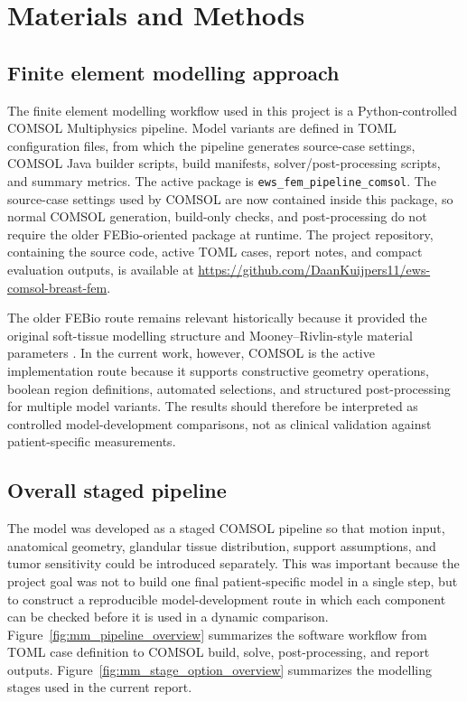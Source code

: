 \section{Materials and Methods}

\subsection{Finite element modelling approach}

The finite element modelling workflow used in this project is a Python-controlled COMSOL Multiphysics pipeline. Model variants are defined in TOML configuration files, from which the pipeline generates source-case settings, COMSOL Java builder scripts, build manifests, solver/post-processing scripts, and summary metrics. The active package is \texttt{ews\_fem\_pipeline\_comsol}. The source-case settings used by COMSOL are now contained inside this package, so normal COMSOL generation, build-only checks, and post-processing do not require the older FEBio-oriented package at runtime. The project repository, containing the source code, active TOML cases, report notes, and compact evaluation outputs, is available at \url{https://github.com/DaanKuijpers11/ews-comsol-breast-fem}.

The older FEBio route remains relevant historically because it provided the original soft-tissue modelling structure and Mooney--Rivlin-style material parameters \cite{BabarendaGamage2017}. In the current work, however, COMSOL is the active implementation route because it supports constructive geometry operations, boolean region definitions, automated selections, and structured post-processing for multiple model variants. The results should therefore be interpreted as controlled model-development comparisons, not as clinical validation against patient-specific measurements.

\subsection{Overall staged pipeline}

The model was developed as a staged COMSOL pipeline so that motion input, anatomical geometry, glandular tissue distribution, support assumptions, and tumor sensitivity could be introduced separately. This was important because the project goal was not to build one final patient-specific model in a single step, but to construct a reproducible model-development route in which each component can be checked before it is used in a dynamic comparison. Figure~\ref{fig:mm_pipeline_overview} summarizes the software workflow from TOML case definition to COMSOL build, solve, post-processing, and report outputs. Figure~\ref{fig:mm_stage_option_overview} summarizes the modelling stages used in the current report.

